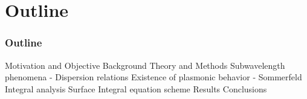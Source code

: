 \documentclass[mathserif,16pt,xcolor=table]{beamer}
\begin{document}
\section{Outline}
\begin{frame}
  \frametitle{Outline}
  \begin{outline}[itemize]
    \1 Motivation and Objective
    \1 Background
    \1 Theory and Methods
      \2 Subwavelength phenomena - Dispersion relations
      \2 Existence of plasmonic behavior - Sommerfeld Integral analysis
      \2 Surface Integral equation scheme
    \1 Results
    \1 Conclusions
  \end{outline}
\end{frame}
\end{document}
